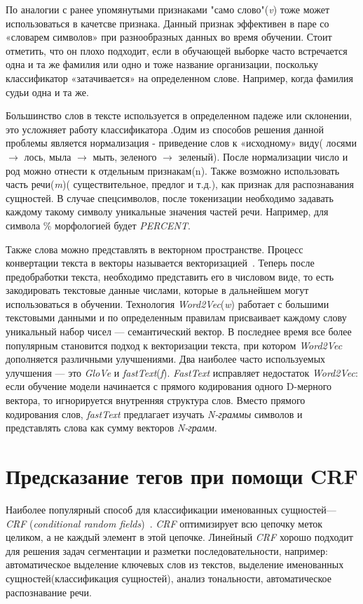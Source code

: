 \documentclass{csmathnotes}
\begin{document}
По аналогии с ранее упомянутыми признаками "само слово"(\emph{v}) тоже может использоваться в качетсве признака. Данный признак эффективен в паре со «словарем символов» при разнообразных данных во время обучении. Стоит отметить, что он плохо подходит, если в обучающей выборке часто встречается одна и та же фамилия или одно и тоже название организации, поскольку классификатор «затачивается» на определенном слове. Например, когда фамилия судьи одна и та же.


Большинство слов в тексте используется в определенном падеже или склонении, это усложняет работу классификатора .Одим из способов решения данной проблемы является нормализация - приведение слов к «исходному» виду( лосями $\rightarrow$  лось, мыла $\rightarrow$ мыть, зеленого $\rightarrow$ зеленый). После нормализации число и род  можно отнести к отдельным признакам(n). Также возможно использовать часть речи(\emph{m})( существительное, предлог и т.д.), как признак для распознавания сущностей. В случае спецсимволов, после токенизации необходимо задавать каждому такому символу уникальные значения частей речи. Например, для символа \% морфологией будет \emph{PERCENT}.

 
Также слова можно представлять в векторном пространстве. Процесс конвертации текста в векторы называется векторизацией~\cite{w2v}. Теперь после предобработки текста, необходимо представить его в числовом виде, то есть закодировать текстовые данные числами, которые в дальнейшем могут использоваться в обучении. Технология \emph{Word2Vec}(\emph{w}) работает с большими текстовыми данными и по определенным правилам присваивает каждому слову уникальный набор чисел — семантический вектор. В последнее время все более популярным становится подход к векторизации текста, при котором \emph{Word2Vec} дополняется различными улучшениями. Два наиболее часто используемых улучшения — это \emph{GloVe} и \emph{fastText}(\emph{f}). \emph{FastText} исправляет недостаток \emph{Word2Vec}: если обучение модели начинается с прямого кодирования одного D-мерного вектора, то игнорируется внутренняя структура слов. Вместо прямого кодирования слов, \emph{fastText} предлагает изучать \emph{N-граммы} символов и представлять слова как сумму векторов \emph{N-грамм}.


\section*{Предсказание тегов при помощи CRF}
Наиболее  популярный способ для классификации именованных сущностей— \emph{CRF} (\emph{conditional random fields})~\cite{HabrCRF}. \emph{CRF} оптимизирует всю цепочку меток целиком, а не каждый элемент в этой цепочке.  Линейный \emph{CRF} хорошо подходит для решения задач сегментации и разметки последовательности, например: автоматическое выделение ключевых слов из текстов, выделение именованных сущностей(классификация сущностей), анализ тональности, автоматическое распознавание речи.
\end{document}
